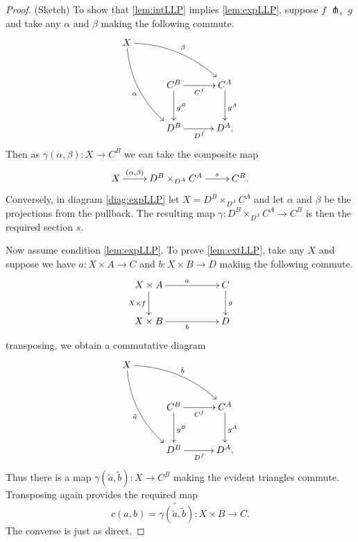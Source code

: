 \documentclass[12pt]{article}
\theoremstyle{definition}
\begin{document}
%
\begin{proof} (Sketch)
To show that \ref{lem:intLLP} implies \ref{lem:expLLP}, suppose $f\ \pitchfork_s\ g$ and take any $\alpha$ and $\beta$ making the following commute.
\begin{equation*}%
\xymatrix@=3em{
X \ar@/{}_{1pc}/[rdd]_{\alpha}  \ar@/{}^{1pc}/[rrd]^{\beta} & & \\
	& C^B \ar[d]^{g^B} \ar[r]_{C^f} 	& C^A \ar[d]^{g^A} \\
	& D^B \ar[r]_{D^f} 				& D^A.
}
\end{equation*}
Then as $\gamma(\alpha,\beta) : X\to C^B$ we can take the composite map
\[\xymatrix{
X \ar[r]^-{(\alpha,\beta)} & D^B\times_{D^A}C^A \ar[r]^-{s} & C^B.
}
\]
Conversely, in diagram \eqref{diag:expLLP} let $X = D^B\times_{D^A}C^A$ and let $\alpha$ and $\beta$ be the projections from the pullback.  The resulting map $\gamma : D^B\times_{D^A}C^A \to C^B$ is then the required section $s$. 

Now assume condition \ref{lem:expLLP}.  To prove \ref{lem:extLLP}, take any $X$ and suppose we have $a : X\times A\to C$ and $b: X\times B\to D$ making the following commute.
\[
\xymatrix{
X\times A \ar[d]_{X\times f} \ar[rr]^{a} && C \ar[d]^{g} \\
X\times B \ar[rr]_{b} && D
}
\]
transposing, we obtain a commutative diagram
\begin{equation*}%
\xymatrix@=3em{
X \ar@/{}_{1pc}/[rdd]_{\tilde{a}}  \ar@/{}^{1pc}/[rrd]^{\tilde{b}} & & \\
	& C^B \ar[d]^{g^B} \ar[r]_{C^f} 	& C^A \ar[d]^{g^A} \\
	& D^B \ar[r]_{D^f} 				& D^A.
}
\end{equation*}
Thus there is a map $\gamma(\tilde{a},\tilde{b}) :  X \to C^B$ making the evident triangles commute.  Transposing again provides the required map
\[
c(a,b) = \widetilde{\gamma(\tilde{a},\tilde{b})} : X\times B \to C.
\]
The converse is just as direct.
%
\end{proof}
%
\end{document}
